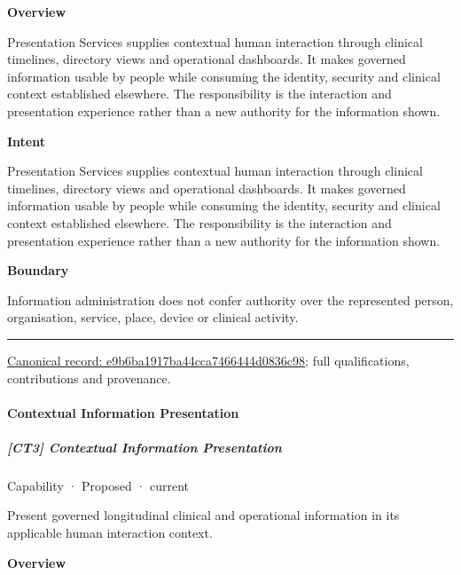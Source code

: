 \textbf{Overview}



Presentation Services supplies contextual human interaction through clinical timelines, directory views and operational dashboards. It makes governed information usable by people while consuming the identity, security and clinical context established elsewhere. The responsibility is the interaction and presentation experience rather than a new authority for the information shown.



\textbf{Intent}



Presentation Services supplies contextual human interaction through clinical timelines, directory views and operational dashboards. It makes governed information usable by people while consuming the identity, security and clinical context established elsewhere. The responsibility is the interaction and presentation experience rather than a new authority for the information shown.



\textbf{Boundary}



Information administration does not confer authority over the represented person, organisation, service, place, device or clinical activity.



\medskip\hrule\medskip

{\footnotesize \href{../../../../continuum/strategy/capability/e9b6ba1917ba44cca7466444d0836c98.md}{Canonical record: e9b6ba1917ba44cca7466444d0836c98}; full qualifications, contributions and provenance.}\par
\paragraph{Contextual Information Presentation}

\subparagraph{[CT3] Contextual Information Presentation}

\label{element:9f900c53ae56488cad69e53c2205e898}
{\small Capability · Proposed · current}\par

Present governed longitudinal clinical and operational information in its applicable human interaction context.



\textbf{Overview}



